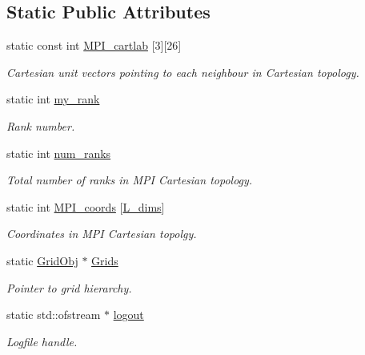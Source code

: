 \subsection*{Static Public Attributes}
\begin{DoxyCompactItemize}
\item 
static const int \hyperlink{class_mpi_manager_a2c3010f87e6a8a6c65e6f975e37fb7d5}{M\+P\+I\+\_\+cartlab} \mbox{[}3\mbox{]}\mbox{[}26\mbox{]}
\begin{DoxyCompactList}\small\item\em Cartesian unit vectors pointing to each neighbour in Cartesian topology. \end{DoxyCompactList}\item 
static int \hyperlink{class_mpi_manager_a8329212abc23e5fa3e32e961b7823b5b}{my\+\_\+rank}
\begin{DoxyCompactList}\small\item\em Rank number. \end{DoxyCompactList}\item 
static int \hyperlink{class_mpi_manager_af5156a5e4519f43230b6b84792464e48}{num\+\_\+ranks}
\begin{DoxyCompactList}\small\item\em Total number of ranks in M\+PI Cartesian topology. \end{DoxyCompactList}\item 
static int \hyperlink{class_mpi_manager_a677a39e98470d3945248a66cf0bc3ec3}{M\+P\+I\+\_\+coords} \mbox{[}\hyperlink{definitions_8h_a11cd469956bf6689c2bc034ee698e0b7}{L\+\_\+dims}\mbox{]}
\begin{DoxyCompactList}\small\item\em Coordinates in M\+PI Cartesian topolgy. \end{DoxyCompactList}\item 
static \hyperlink{class_grid_obj}{Grid\+Obj} $\ast$ \hyperlink{class_mpi_manager_a1520da6b8a663cba25a1a9822dd81543}{Grids}
\begin{DoxyCompactList}\small\item\em Pointer to grid hierarchy. \end{DoxyCompactList}\item 
static std\+::ofstream $\ast$ \hyperlink{class_mpi_manager_afbd3a2866235c1d4a32e6806318061fd}{logout}
\begin{DoxyCompactList}\small\item\em Logfile handle. \end{DoxyCompactList}\end{DoxyCompactItemize}


